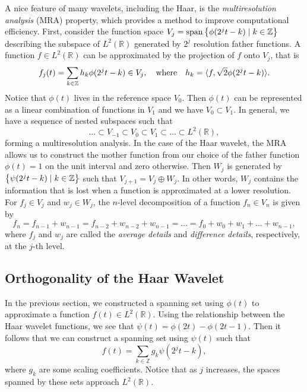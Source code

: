 \documentclass{article}
\DeclarePairedDelimiter{\iprod}{\langle}{\rangle}
\def\RR{\mathbb{R}}
\def\ZZ{\mathbb{Z}}
\DeclareMathOperator{\spans}{span}
\theoremstyle{definition}
\begin{document}
  A nice feature of many wavelets, including the Haar, is the \textit{multiresolution analysis} (MRA) property, which provides a method to improve computational efficiency. First, consider the function space \(V_j = \spans\qty{\phi(2^jt-k) \mid k \in \ZZ}\) describing the subspace of \(L^2(\mathbb{R})\) generated by \(2^j\) resolution father functions. A function \(f \in L^2(\RR)\) can be approximated by the projection of \(f\) onto \(V_j\), that is
  \begin{equation} \label{eqn:proj-f-onto-vj}
    f_j(t) = \sum_{k \in \ZZ} h_k \phi(2^jt-k) \in V_j, 
    \qq{where}
    h_k = \iprod{f,\sqrt{2}\phi(2^jt-k)}.
  \end{equation}
  Notice that \(\phi(t)\) lives in the reference space \(V_0\). Then \(\phi(t)\) can be represented as a linear combination of functions in \(V_1\) and we have \(V_0 \subset V_1\). In general, we have a sequence of nested subspaces such that
  \begin{equation} \label{eqn:mra}
    \dots \subset V_{-1} \subset V_0 \subset V_1 \subset \dots \subset L^2(\mathbb{R}),
  \end{equation}
  forming a multiresolution analysis. In the case of the Haar wavelet, the MRA allows us to construct the mother function from our choice of the father function \(\phi(t) = 1\) on the unit interval and zero otherwise. Then \(W_j\) is generated by \(\qty{\psi(2^jt-k) \mid k \in \ZZ}\) such that \(V_{j+1} = V_j \oplus W_j\). In other words, \(W_j\) contains the information that is lost when a function is approximated at a lower resolution. For \(f_j \in V_j\) and \(w_j \in W_j\), the \(n\)-level decomposition of a function \(f_n \in V_n\) is given by
  \[f_n = f_{n-1} + w_{n-1} = f_{n-2} + w_{n-2} + w_{n-1} = \dots = f_0 + w_0 + w_1 + \dots + w_{n-1},\]
  where \(f_j\) and \(w_j\) are called the \textit{average details} and \textit{difference details}, respectively, at the \(j\)-th level.

  \subsection{Orthogonality of the Haar Wavelet}

  In the previous section, we constructed a spanning set using \(\phi(t)\) to approximate a function \(f(t) \in L^2(\RR)\). Using the relationship between the Haar wavelet functions, we see that \(\psi(t) = \phi(2t) - \phi(2t-1)\). Then it follows that we can construct a spanning set using \(\psi(t)\) such that
  \begin{equation} \label{eqn:proj-f-onto-wj}
    f(t) = \sum_{k \in \ZZ} g_k \psi(2^jt-k),
  \end{equation}
  where \(g_k\) are some scaling coefficients. Notice that as \(j\) increases, the spaces spanned by these sets approach \(L^2(\RR)\).
\end{document}
